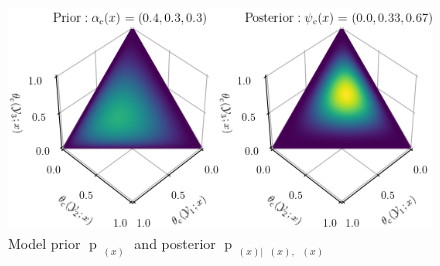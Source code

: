 \documentclass{article}
\DeclareMathOperator{\xrm}{\mathrm{x}}
\DeclareMathOperator{\yrm}{\mathrm{y}}
\DeclareMathOperator{\Drm}{\mathrm{D}}
\DeclareMathOperator{\Prm}{\mathrm{P}}
\DeclareMathOperator{\prm}{\mathrm{p}}
\DeclareMathOperator{\upthetac}{\uptheta_\text{c}}
\DeclareMathOperator{\psim}{\psi_\text{m}}
\DeclareMathOperator{\uppsim}{\uppsi_\text{m}}
\DeclareMathOperator{\uppsic}{\uppsi_\text{c}}
\DeclareMathOperator{\alpham}{\alpha_\text{m}}
\DeclareMathOperator{\alphac}{\alpha_\text{c}}
\begin{document}
\begin{figure}
\centering
\includegraphics[width=1\linewidth]{SSP_2021/P_theta_post.png}
\caption{Model prior $\prm_{\upthetac(x)}$ and posterior $\prm_{\upthetac(x) | \uppsim(x),\uppsic(x)}$}
\label{fig:P_theta_post_tilde}
\end{figure}



%
\end{document}
